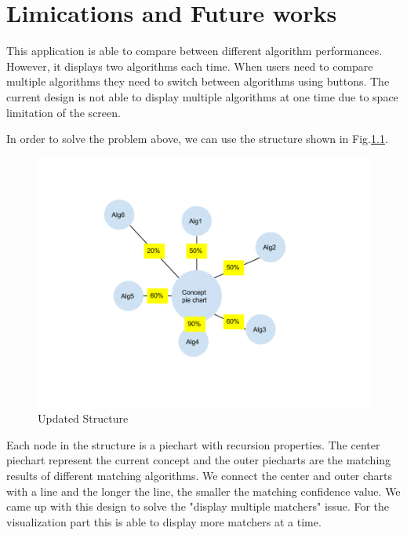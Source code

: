 \chapter {Limications and Future works}
This application is able to compare between different algorithm performances. However, it displays two algorithms each time. When users need to compare multiple algorithms they need to switch between algorithms using buttons. The current design is not able to display multiple algorithms at one time due to space limitation of the screen. 

In order to solve the problem above, we can use the structure shown in Fig.\ref{fig:updated_structure}. 

\begin{figure}[!ht]
	\centering
	\includegraphics[width=4.5in]{pics/structure.png}
	\caption{Updated Structure}
	\label{fig:updated_structure}
\end{figure}

Each node in the structure is a piechart with recursion properties. The center piechart represent the current concept and the outer piecharts are the matching results of different matching algorithms. We connect the center and outer charts with a line and the longer the line, the smaller the matching confidence value. We came up with this design to solve the "display multiple matchers" issue. For the visualization part this is able to display more matchers at a time.
